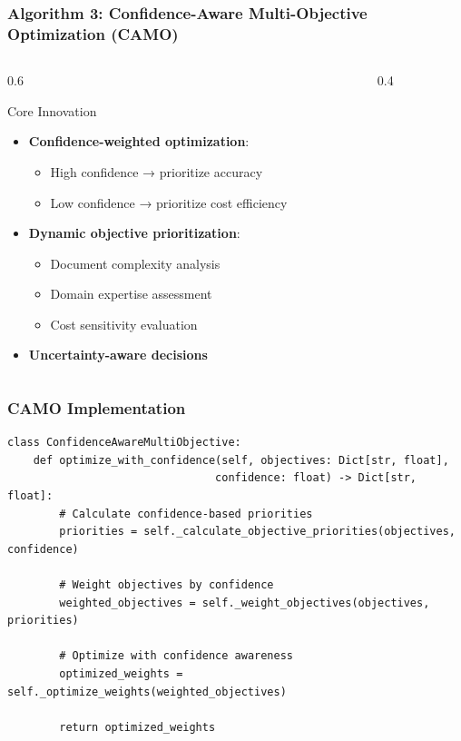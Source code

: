 \documentclass{beamer}
\begin{document}
\begin{frame}
\frametitle{Algorithm 3: Confidence-Aware Multi-Objective Optimization (CAMO)}
\begin{columns}
\begin{column}{0.6\textwidth}
\begin{block}{Core Innovation}
\begin{itemize}
\item \textbf{Confidence-weighted optimization}:
    \begin{itemize}
    \item High confidence → prioritize accuracy
    \item Low confidence → prioritize cost efficiency
    \end{itemize}
\item \textbf{Dynamic objective prioritization}:
    \begin{itemize}
    \item Document complexity analysis
    \item Domain expertise assessment
    \item Cost sensitivity evaluation
    \end{itemize}
\item \textbf{Uncertainty-aware decisions}
\end{itemize}
\end{block}
\end{column}
\begin{column}{0.4\textwidth}
\begin{center}
\end{center}
\end{column}
\end{columns}
\end{frame}

\begin{frame}[fragile]
\frametitle{CAMO Implementation}
\begin{lstlisting}
class ConfidenceAwareMultiObjective:
    def optimize_with_confidence(self, objectives: Dict[str, float], 
                                confidence: float) -> Dict[str, float]:
        # Calculate confidence-based priorities
        priorities = self._calculate_objective_priorities(objectives, confidence)
        
        # Weight objectives by confidence
        weighted_objectives = self._weight_objectives(objectives, priorities)
        
        # Optimize with confidence awareness
        optimized_weights = self._optimize_weights(weighted_objectives)
        
        return optimized_weights
\end{lstlisting}
\end{frame}
\end{document}
